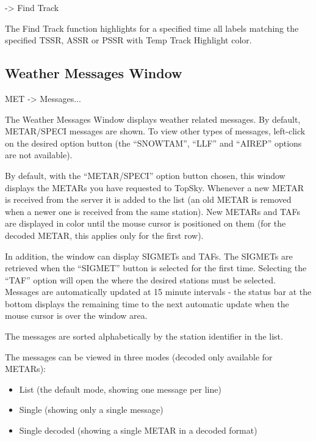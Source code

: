 \documentclass[a4paper,oneside,11pt]{memoir}
\begin{document}
 -> Find Track 

\bigskip

The Find Track function highlights for a specified time all labels matching the specified TSSR, ASSR or PSSR with Temp Track Highlight color.

\subsection{Weather Messages Window}
\label{win:wxmw}

 MET -> Messages...

\bigskip


The Weather Messages Window displays weather related messages. By default, METAR/SPECI messages are shown. To view other types of messages, left-click on the desired option button (the “SNOWTAM”, “LLF” and “AIREP” options are not available).

\bigskip

By default, with the “METAR/SPECI” option button chosen, this window displays the METARs you have requested to TopSky. Whenever a new METAR is received from the server it is added to the list (an old METAR is removed when a newer one is received from the same station). New METARs and TAFs are displayed in  color until the mouse cursor is positioned on them (for the decoded METAR, this applies only for the first row).

\bigskip

In addition, the window can display SIGMETs and TAFs. The SIGMETs are retrieved when the “SIGMET” button is selected for the first time. Selecting the “TAF” option will open the  where the desired stations must be selected. Messages are automatically updated at 15 minute intervals - the status bar at the bottom displays the remaining time to the next automatic update when the mouse cursor is over the window area.

\bigskip

The messages are sorted alphabetically by the station identifier in the list.

\bigskip

The messages can be viewed in three modes (decoded only available for METARs):

\begin{itemize}
    \item List (the default mode, showing one message per line)
    \item Single (showing only a single message)
    \item Single decoded (showing a single METAR in a decoded format)
\end{itemize}
\end{document}
